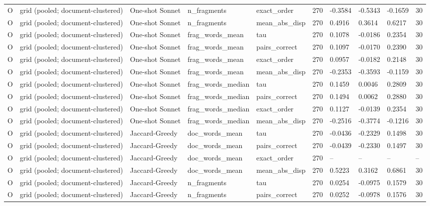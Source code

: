 \begin{table}[t]
{\begin{tabular}{llllllllll}
O & grid (pooled; document-clustered) & One-shot Sonnet & n\_fragments & exact\_order & 270 & -0.3584 & -0.5343 & -0.1659 & 30 \\
O & grid (pooled; document-clustered) & One-shot Sonnet & n\_fragments & mean\_abs\_disp & 270 & 0.4916 & 0.3614 & 0.6217 & 30 \\
O & grid (pooled; document-clustered) & One-shot Sonnet & frag\_words\_mean & tau & 270 & 0.1078 & -0.0186 & 0.2354 & 30 \\
O & grid (pooled; document-clustered) & One-shot Sonnet & frag\_words\_mean & pairs\_correct & 270 & 0.1097 & -0.0170 & 0.2390 & 30 \\
O & grid (pooled; document-clustered) & One-shot Sonnet & frag\_words\_mean & exact\_order & 270 & 0.0957 & -0.0182 & 0.2148 & 30 \\
O & grid (pooled; document-clustered) & One-shot Sonnet & frag\_words\_mean & mean\_abs\_disp & 270 & -0.2353 & -0.3593 & -0.1159 & 30 \\
O & grid (pooled; document-clustered) & One-shot Sonnet & frag\_words\_median & tau & 270 & 0.1459 & 0.0046 & 0.2809 & 30 \\
O & grid (pooled; document-clustered) & One-shot Sonnet & frag\_words\_median & pairs\_correct & 270 & 0.1494 & 0.0062 & 0.2880 & 30 \\
O & grid (pooled; document-clustered) & One-shot Sonnet & frag\_words\_median & exact\_order & 270 & 0.1127 & -0.0139 & 0.2354 & 30 \\
O & grid (pooled; document-clustered) & One-shot Sonnet & frag\_words\_median & mean\_abs\_disp & 270 & -0.2516 & -0.3774 & -0.1216 & 30 \\
O & grid (pooled; document-clustered) & Jaccard-Greedy & doc\_words\_mean & tau & 270 & -0.0436 & -0.2329 & 0.1498 & 30 \\
O & grid (pooled; document-clustered) & Jaccard-Greedy & doc\_words\_mean & pairs\_correct & 270 & -0.0439 & -0.2330 & 0.1497 & 30 \\
O & grid (pooled; document-clustered) & Jaccard-Greedy & doc\_words\_mean & exact\_order & 270 & -- & -- & -- & -- \\
O & grid (pooled; document-clustered) & Jaccard-Greedy & doc\_words\_mean & mean\_abs\_disp & 270 & 0.5223 & 0.3162 & 0.6861 & 30 \\
O & grid (pooled; document-clustered) & Jaccard-Greedy & n\_fragments & tau & 270 & 0.0254 & -0.0975 & 0.1579 & 30 \\
O & grid (pooled; document-clustered) & Jaccard-Greedy & n\_fragments & pairs\_correct & 270 & 0.0252 & -0.0978 & 0.1576 & 30 \\

\end{tabular}}
\end{table}
